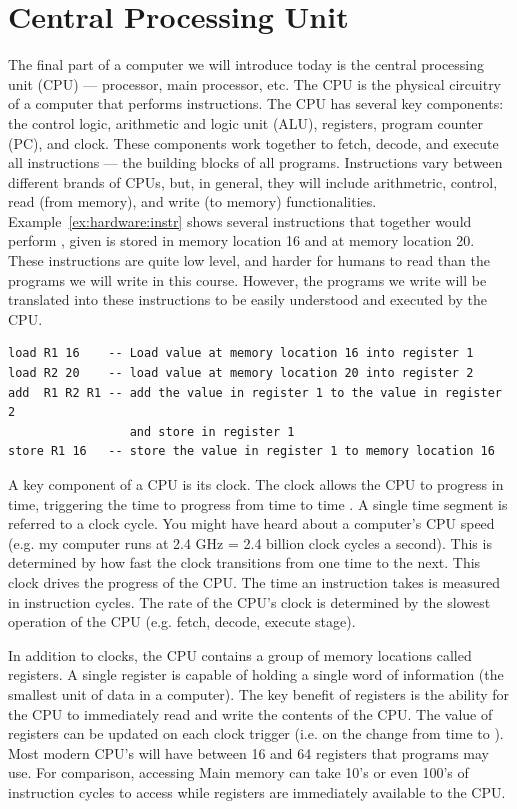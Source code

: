 \section {Central Processing Unit}

The final part of a computer we will introduce today is the central processing
unit (CPU) --- processor, main processor, etc. The CPU is the physical
circuitry of a computer that performs instructions. The CPU has several key
components: the control logic, arithmetic and logic unit (ALU), registers,
program counter (PC), and clock. These components work together to 
fetch, decode, and execute all instructions --- the building blocks of all programs.
Instructions vary between different brands of CPUs, but, in general, they will
include arithmetric, control, read (from memory), and write (to memory) functionalities.
Example~\ref{ex:hardware:instr} shows several instructions
that together would perform , given  is stored in memory
location 16 and  at memory location 20. These instructions are quite low
level, and harder for humans to read than the programs we will write in this course.
However, the programs we write will be translated into these instructions to be
easily understood and executed by the CPU.

\begin{example}
\label{ex:hardware:instr}
\begin{verbatim}
load R1 16    -- Load value at memory location 16 into register 1
load R2 20    -- load value at memory location 20 into register 2
add  R1 R2 R1 -- add the value in register 1 to the value in register 2
                 and store in register 1
store R1 16   -- store the value in register 1 to memory location 16
\end{verbatim}
\end{example}

A key component of a CPU is its clock. The clock allows the CPU to progress in time,
triggering the time to progress from time  to time . A single time
segment is referred to a clock cycle. You might have heard about a computer's CPU
speed (e.g. my computer runs at 2.4 GHz = 2.4 billion clock cycles a second). This
is determined by how fast the clock transitions from one time to the next. This
clock drives the progress of the CPU. The time an instruction takes is measured
in instruction cycles. The rate of the CPU's clock is determined by the slowest
operation of the CPU (e.g. fetch, decode, execute stage).

In addition to clocks, the CPU contains a group of memory locations called registers.
A single register is capable of holding a single word of information (the smallest
unit of data in a computer). The key benefit of registers is the ability for the
CPU to immediately read and write the contents of the CPU. The value of registers
can be updated on each clock trigger (i.e. on the change from time  to ).
Most modern CPU's will have between 16 and 64 registers that programs may use.
For comparison, accessing Main memory can take 10's or even 100's of instruction
cycles to access while registers are immediately available to the CPU.

